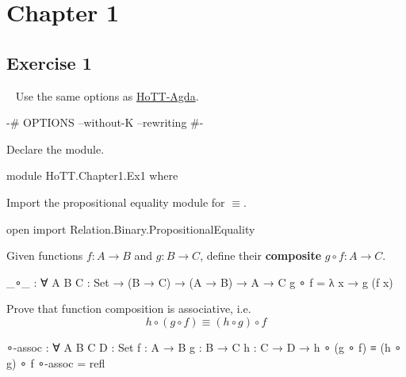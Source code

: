\section{Chapter 1}

\subsection{Exercise 1}\
\newline
Use the same options as \href{https://github.com/HoTT/HoTT-Agda}{HoTT-Agda}.

\begin{code}
{-# OPTIONS --without-K --rewriting #-}
\end{code}

Declare the module.

\begin{code}
module HoTT.Chapter1.Ex1 where
\end{code}

Import the propositional equality module for $\equiv$.

\begin{code}
open import Relation.Binary.PropositionalEquality
\end{code}

Given functions $f : A \to B$ and $g : B \to C$, define their {\bf composite} $g \circ f : A \to C$.

\begin{code}
_∘_ : ∀ {A B C : Set} → (B → C) → (A → B) → A → C
g ∘ f = λ x → g (f x)
\end{code}

Prove that function composition is associative, i.e.
\[
  h \circ (g \circ f) \equiv (h \circ g) \circ f
\]

\begin{code}
∘-assoc : ∀ {A B C D : Set} {f : A → B} {g : B → C} {h : C → D} →
          h ∘ (g ∘ f) ≡ (h ∘ g) ∘ f
∘-assoc = refl
\end{code}

